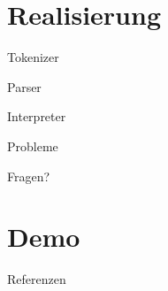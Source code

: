 \section{Realisierung}
  \begin{frame}{Tokenizer}
  \end{frame}
  \begin{frame}{Parser} %
  \end{frame}
  \begin{frame}{Interpreter}
  \end{frame}
  \begin{frame}{Probleme} %
  \end{frame}

  \begin{frame}[standout]
    Fragen?
  \end{frame}

  \section{Demo}

  \appendix
  \begin{frame}[allowframebreaks]{Referenzen}
  \end{frame}


